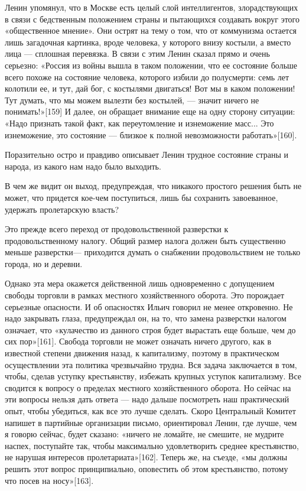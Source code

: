 \documentclass[12pt, a4paper, openany]{book}
\begin{document}
Ленин упомянул, что в Москве есть целый слой интеллигентов, злорадствующих в связи с бедственным положением страны и пытающихся создавать вокруг этого «общественное мнение». Они острят на тему о том, что от коммунизма остается лишь загадочная картинка, вроде человека, у которого внизу костыли, а вместо лица — сплошная перевязка. В связи с этим Ленин сказал прямо и очень серьезно: «Россия из войны вышла в таком положении, что ее состояние больше всего похоже на состояние человека, которого избили до полусмерти: семь лет колотили ее, и тут, дай бог, с костылями двигаться! Вот мы в каком положении! Тут думать, что мы можем вылезти без костылей, — значит ничего не понимать!»[159] И далее, он обращает внимание еще на одну сторону ситуации: «Надо признать такой факт, как переутомление и изнеможение масс... Это изнеможение, это состояние — близкое к полной невозможности работать»[160].

Поразительно остро и правдиво описывает Ленин трудное состояние страны и народа, из какого нам надо было выходить.

В чем же видит он выход, предупреждая, что никакого простого решения быть не может, что придется кое-чем поступиться, лишь бы сохранить завоеванное, удержать пролетарскую власть?

Это прежде всего переход от продовольственной разверстки к продовольственному налогу. Общий размер налога должен быть существенно меньше разверстки— приходится думать о снабжении продовольствием не только города, но и деревни.

Однако эта мера окажется действенной лишь одновременно с допущением свободы торговли в рамках местного хозяйственного оборота. Это порождает серьезные опасности. И об опасностях Ильич говорил не менее откровенно. Не надо закрывать глаза, предупреждал он, на то, что замена разверстки налогом означает, что «кулачество из данного строя будет вырастать еще больше, чем до сих пор»[161]. Свобода торговли не может означать ничего другого, как в известной степени движения назад, к капитализму, поэтому в практическом осуществлении эта политика чрезвычайно трудна. Вся задача заключается в том, чтобы, сделав уступку крестьянству, избежать крупных уступок капитализму. Все сводится к вопросу о пределах местного хозяйственного оборота. Но сейчас на эти вопросы нельзя дать ответа — надо дальше посмотреть наш практический опыт, чтобы убедиться, как все это лучше сделать. Скоро Центральный Комитет напишет в партийные организации письмо, ориентировал Ленин, где лучше, чем я говорю сейчас, будет сказано: «ничего не ломайте, не смешите, не мудрите наспех, поступайте так, чтобы максимально удовлетворить среднее крестьянство, не нарушая интересов пролетариата»[162]. Теперь же, на съезде, «мы должны решить этот вопрос принципиально, оповестить об этом крестьянство, потому что посев на носу»[163].
\end{document}
